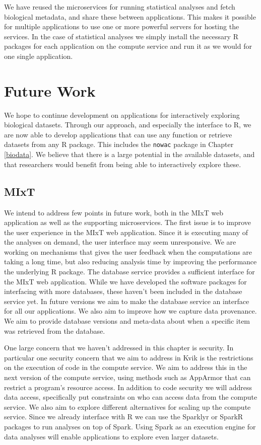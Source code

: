 We have reused the microservices for running statistical analyses and
fetch biological metadata, and share these between applications. This makes it
possible for multiple applications to use one or more powerful servers for
hosting the services. In the case of statistical analyses we simply install the
necessary R packages for each application on the compute service and run it as
we would for one single application. 

\section{Future Work} 
We hope to continue development on applications for interactively exploring
biological datasets. Through our approach, and especially the interface to R, 
we are now able to develop applications that can use any function or retrieve
datasets from any R package. This includes the \texttt{nowac} package in
Chapter \ref{biodata}. We believe that there is a large potential in the
available datasets, and that researchers would benefit from being able to
interactively explore these. 

\subsection{MIxT} 
We intend to address few points in future work, both in the
MIxT web application as well as the supporting microservices.  The first issue
is to improve the user experience in the MIxT web application.  Since it is
executing many of the analyses on demand, the user interface may seem
unresponsive. We are working on mechanisms that gives the user feedback when the
computations are taking a long time, but also reducing analysis time by
improving the performance the underlying R package. The database service
provides a sufficient interface for the MIxT web application. While we have
developed the software packages for interfacing with more databases, these
haven't been included in the database service yet. In future versions we aim to
make the database service an interface for all our applications.  We also aim to
improve how we capture data provenance. We aim to provide database versions and
meta-data about when a specific item was retrieved from the database. 

One large concern that we haven't addressed in this chapter is security. In
particular one security concern that we aim to address in Kvik is the
restrictions on the execution of code in the compute service. We aim to address
this in the next version of the compute service, using methods such as
AppArmor\cite{apparmor} that can restrict a program's resource access. In
addition to code security we will address data access, specifically put
constraints on who can access data from the compute service.  We also aim to
explore different alternatives for scaling up the compute service.  Since we
already interface with R we can use the Sparklyr\cite{sparklyr} or
SparkR\cite{sparkr} packages to run analyses on top of
Spark.\cite{zaharia2012resilient} Using Spark as an execution engine for data
analyses will enable applications to explore even larger datasets.

